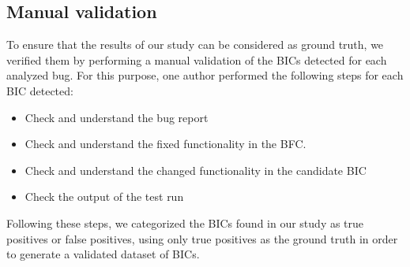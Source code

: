 

\subsection{Manual validation}
\label{subsec:manual}

To ensure that the results of our study can be considered as ground truth, we verified them by performing a manual validation of the BICs detected for each analyzed bug. For this purpose, one author performed the following steps for each BIC detected:

\begin{itemize}
    \item Check and understand the bug report
    \item Check and understand the fixed functionality in the BFC.
    \item Check and understand the changed functionality in the candidate BIC
    \item Check the output of the test run
\end{itemize}

Following these steps, we categorized the BICs found in our study as true positives or false positives, using only true positives as the ground truth in order to generate a validated dataset of BICs.

